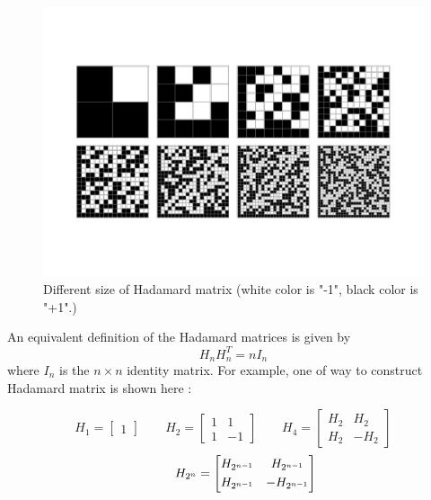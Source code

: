 \begin{figure}[h]
\centering
\includegraphics[width=0.7\linewidth]{figs/HadamardMatrices_800}
\caption{Different size of Hadamard matrix (white color is "-1", black color is "+1".)}
\label{fig:HadamardMatrices_800}
\end{figure}




	An equivalent definition of the Hadamard matrices is given by 
	$$ H_{n} H_{n}^T = n  I_{n} $$
	where $I_{n}$ is the $n \times n$ identity matrix.
	For example, one of way to construct Hadamard matrix is shown here :
	
	$$
	H_{1} = \begin{bmatrix}
	1
	\end{bmatrix}
	\qquad
	H_{2} = \begin{bmatrix}
	1 & 1           \\[0.3em]
	1& -1
	\end{bmatrix}	
	\qquad
	H_{4} = \begin{bmatrix}
	H_{2} & H_{2}           \\[0.3em]
	H_{2}& -H_{2}
	\end{bmatrix}	
	$$
	$$
	\centering
	\qquad
	H_{2^{n}} = \begin{bmatrix}
	H_{2^{n-1}} & H_{2^{n-1}}           \\[0.3em]
	H_{2^{n-1}}& -H_{2^{n-1}}            
	\end{bmatrix}	
	$$

